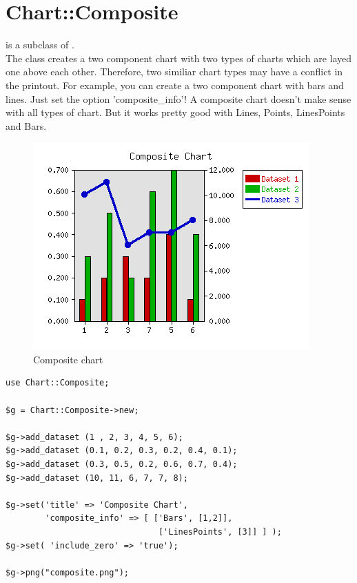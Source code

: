 %
\section{Chart::Composite}
\begin{Description}  is a subclass of .\\
The class  creates a two component chart 
with two types of charts which are layed 
one above each other.
Therefore, two similiar chart types may have a conflict in the printout.
For example, you can create a two component chart with bars and lines. 
Just set the option 'composite\_info'! 
A composite chart doesn't make sense with all types of chart. 
But it works pretty good with Lines, Points, LinesPoints and Bars.
\end{Description}

\begin{figure}[h]
	\begin{center}
		\includegraphics[scale=0.6]{composite_f.png}
	\end{center}
	\caption{Composite chart}
	\label{fig:composite}
\end{figure}
\begin{verbatim}
use Chart::Composite;

$g = Chart::Composite->new;

$g->add_dataset (1 , 2, 3, 4, 5, 6);
$g->add_dataset (0.1, 0.2, 0.3, 0.2, 0.4, 0.1);
$g->add_dataset (0.3, 0.5, 0.2, 0.6, 0.7, 0.4);
$g->add_dataset (10, 11, 6, 7, 7, 8);

$g->set('title' => 'Composite Chart',
        'composite_info' => [ ['Bars', [1,2]],
                               ['LinesPoints', [3]] ] );
$g->set( 'include_zero' => 'true');

$g->png("composite.png");
\end{verbatim}

